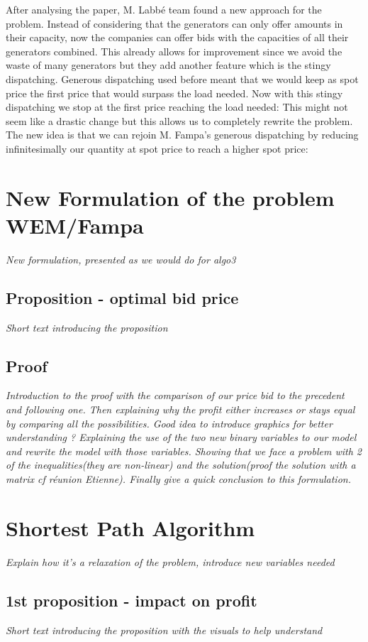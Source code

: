 \documentclass[letterpaper]{article}
\begin{document}
After analysing the paper, M. Labb\'e team found a new approach for the problem. Instead of considering that the generators can only offer amounts in their capacity, now the companies can offer bids with the capacities of all their generators combined. This already allows for improvement since we avoid the waste of many generators but they add another feature which is the stingy dispatching.
Generous dispatching used before meant that we would keep as spot price the first price that would surpass the load needed. Now with this stingy dispatching we stop at the first price reaching the load needed: 
This might not seem like a drastic change but this allows us to completely rewrite the problem. The new idea is that we can rejoin M. Fampa's generous dispatching by reducing infinitesimally our quantity at spot price to reach a higher spot price: 
\section{New Formulation of the problem WEM/Fampa}
\textit{New formulation, presented as we would do for algo3}
\subsection{Proposition - optimal bid price}
\textit{Short text introducing the proposition} 
\subsection{Proof}
\textit{Introduction to the proof with the comparison of our price bid to the precedent and following one. Then explaining why the profit either increases or stays equal by comparing all the possibilities. Good idea to introduce graphics for better understanding ? Explaining the use of the two new binary variables to our model and rewrite the model with those variables. Showing that we face a problem with 2 of the inequalities(they are non-linear) and the solution(proof the solution with a matrix cf réunion Etienne). Finally give a quick conclusion to this formulation.}

\section{Shortest Path Algorithm}
\textit{Explain how it's a relaxation of the problem, introduce new variables needed}
\subsection{1st proposition - impact on profit}
\textit{Short text introducing the proposition with the visuals to help understand }
\end{document}
